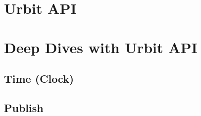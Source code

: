 \section{Urbit API}

\section{Deep Dives with Urbit API}

\subsection{Time (Clock)}

\subsection{Publish}

\subsection{\graphstore}
